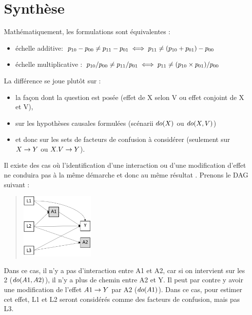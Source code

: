\documentclass[
]{book}
\providecommand{\tightlist}{%
  \setlength{\itemsep}{0pt}\setlength{\parskip}{0pt}}
\begin{document}
\hypertarget{synthuxe8se}{%
\section{Synthèse}\label{synthuxe8se}}

Mathématiquement, les formulations sont équivalentes :

\begin{itemize}
\tightlist
\item
  échelle additive: \(\small p_{10} -p_{00} \neq p_{11}- p_{01} \iff p_{11} \neq (p_{10}+p_{01})- p_{00}\)
\item
  échelle multiplicative : \(\small p_{10} /p_{00} \neq p_{11}/ p_{01} \iff p_{11} \neq (p_{10} \times p_{01})/p_{00}\)
\end{itemize}

La différence se joue plutôt sur :

\begin{itemize}
\tightlist
\item
  la façon dont la question est posée (effet de X selon V ou effet conjoint de X et V),
\item
  sur les hypothèses causales formulées (scénarii \(\small do(X)\) ou \(\small do(X,V)\))
\item
  et donc sur les sets de facteurs de confusion à considérer (seulement sur \(\small X \rightarrow Y\) ou \(\small X.V \rightarrow Y\)).
\end{itemize}

Il existe des cas où l'identification d'une interaction ou d'une modification d'effet ne conduira pas à la même démarche et donc au même résultat \citet{vanderweele_distinction_2009}. Prenons le DAG suivant :

\begin{quote}
\includegraphics[width=0.3\textwidth,height=\textheight]{img/Image12.png}
\end{quote}

Dans ce cas, il n'y a pas d'interaction entre A1 et A2, car si on intervient sur les 2 (\(\small do(A1, A2)\)), il n'y a plus de chemin entre A2 et Y. Il peut par contre y avoir une modification de l'effet \(\small A1 \rightarrow Y\) par A2 (\(\small do(A1)\)). Dans ce cas, pour estimer cet effet, L1 et L2 seront considérés comme des facteurs de confusion, mais pas L3.
\end{document}
